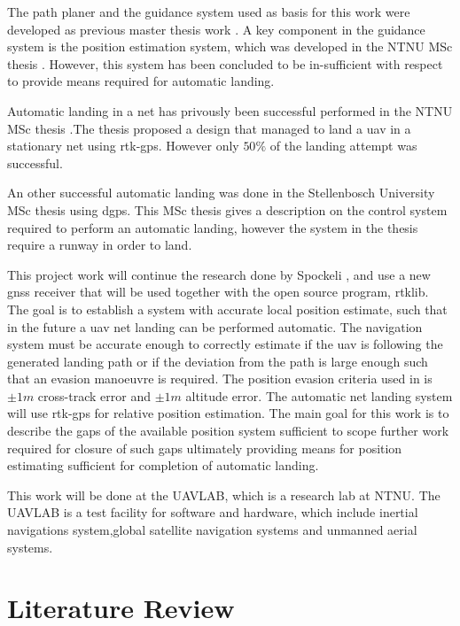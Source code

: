 The path planer and the guidance system used as basis for this work were developed as previous master thesis work \citep{Froelich}. A key component in the guidance system is the position estimation system, which was developed in the NTNU MSc thesis \citep{Spockeli}. However, this system has been concluded to be in-sufficient with respect to provide means required for automatic landing.

Automatic landing in a net has privously been successful performed in the NTNU MSc thesis \citep{Skulstad&Syversen}.The thesis proposed a design that managed to land a \gls{uav} in a stationary net using \gls{rtk-gps}. However only $50\%$ of the landing attempt was successful. 

An other successful automatic landing was done in the Stellenbosch University MSc thesis \citep{smit2013autonomous} using \acrfull{dgps}. This MSc thesis gives a description on the control system required to perform an automatic landing, however the system in the thesis require a runway in order to land.

This project work will continue the research done by Spockeli \citep{Spockeli}, and use a new \gls{gnss} receiver that will be used together with the open source program, \gls{rtklib}. The goal is to establish a system with accurate local position estimate, such that in the future a \gls{uav} net landing can be performed automatic. The navigation system must be accurate enough to correctly estimate if the \gls{uav} is following the generated landing path or if the deviation from the path is large enough such that an evasion manoeuvre is required. The position evasion criteria used in \citep{Froelich} is $\pm1m$ cross-track error and $\pm1m$ altitude error.
The automatic net landing system will use \gls{rtk-gps} for relative position estimation. The main goal for this work is to describe the gaps of the available position system sufficient to scope further work required for closure of such gaps ultimately providing means for position estimating sufficient for completion of automatic landing.

This work will be done at the UAVLAB, which is a research lab at NTNU. The UAVLAB is a test facility for software and hardware, which include inertial navigations system,global satellite navigation systems and unmanned aerial systems.
\section{Literature Review}
 
